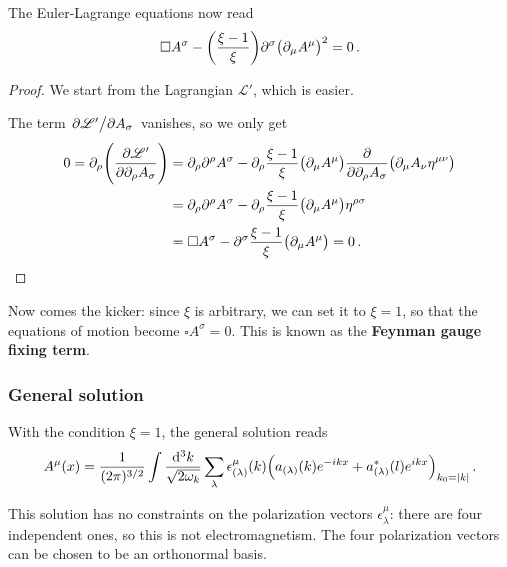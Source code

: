 \documentclass[main.tex]{subfiles}
\begin{document}
\begin{claim}
The Euler-Lagrange equations now read 
%
\begin{align}
\square A^{\sigma } - \qty(\frac{\xi -1}{\xi }) \partial^{\sigma }
\qty(\partial_{\mu } A^{ \mu })^2 = 0
\,.
\end{align}
\end{claim}

\begin{proof}
We start from the Lagrangian \(\mathscr{L}'\), which is easier. 

The term \(\pdv*{\mathscr{L}'}{A_{\sigma }}\) vanishes, so we only get 
%
\begin{subequations}
\begin{align}
0=\partial_{\rho } \qty(\pdv{\mathscr{L}'}{\partial_{\rho } A_{\sigma }}) 
&= \partial_{\rho } \partial^{\rho } A^{\sigma } - \partial_{\rho } 
\frac{\xi - 1}{\xi } \qty(\partial_{\mu } A^{\mu }) \pdv{}{\partial_{\rho } A_{\sigma }} \qty(\partial_{\mu } A_{\nu } \eta^{\mu \nu })  \\
&= \partial_{\rho } \partial^{\rho } A^{\sigma } - \partial_{\rho } 
\frac{\xi - 1}{\xi } \qty(\partial_{\mu } A^{\mu }) \eta^{\rho \sigma }  \\
&= \square A^{\sigma } - \partial^{\sigma } 
\frac{\xi - 1}{\xi } \qty(\partial_{\mu } A^{\mu }) =0
\,. 
\end{align}
\end{subequations}
\end{proof}

Now comes the kicker: since \(\xi \) is arbitrary, we can set it to \(\xi = 1\), so that the equations of motion become \(\square A^{\sigma } = 0\). This is known as the \textbf{Feynman gauge fixing term}.

\subsubsection{General solution}

With the condition \(\xi = 1\), the general solution reads 
%
\begin{align}
A^{\mu } (x) = \frac{1}{(2\pi )^{3/2}} \int \frac{ \dd[3]{k}}{\sqrt{2 \omega_{k}}} 
\sum _{\lambda } \epsilon^{\mu }_{(\lambda )}(k)
\qty(a_{(\lambda )}(k) e^{-ikx} + a^{*}_{(\lambda )} (l) e^{ikx})_{k_0 = \abs{k}}
\,.
\end{align}

This solution has no constraints on the polarization vectors \(\epsilon^{\mu }_{\lambda }\): there are four independent ones, so this is not electromagnetism. 
The four polarization vectors can be chosen to be an orthonormal basis. 
\end{document}
